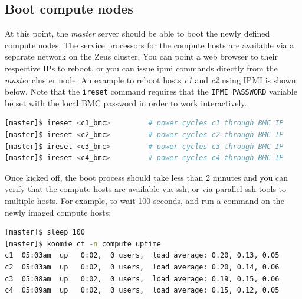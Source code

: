 \documentclass[letterpaper]{article}
\begin{document}


\subsection{Boot compute nodes}

At this point, the {\em master} server should be able to boot the newly defined
compute nodes.  The service processors for the compute hosts are available via
a separate network on the Zeus cluster. You can point a web browser to their
respective IPs to reboot, or you can issue ipmi commands directly from the {\em
  master} cluster node.  An example to reboot hosts {\em c1} and {\em c2} using
IPMI is shown below.  Note that the \texttt{ireset} command requires that the
\texttt{IPMI\_PASSWORD} variable be set with the local BMC password in order to
work interactively.

\vspace*{0.2cm}


\begin{lstlisting}[language=bash,keywords={},upquote=true]
[master]$ ireset <c1_bmc>         # power cycles c1 through BMC IP
[master]$ ireset <c2_bmc>         # power cycles c2 through BMC IP
[master]$ ireset <c3_bmc>         # power cycles c3 through BMC IP
[master]$ ireset <c4_bmc>         # power cycles c4 through BMC IP
\end{lstlisting} 


\vspace*{0.25cm}
Once kicked off, the boot process should take less than 2 minutes and you can
verify that the compute hosts are available via ssh, or via parallel ssh tools to multiple
hosts. For example, to wait 100 seconds, and run a command on the newly imaged
compute hosts:


\vspace*{0.2cm}
\begin{lstlisting}[language=bash]
[master]$ sleep 100
[master]$ koomie_cf -n compute uptime
c1  05:03am  up   0:02,  0 users,  load average: 0.20, 0.13, 0.05
c2  05:03am  up   0:02,  0 users,  load average: 0.20, 0.14, 0.06
c3  05:08am  up   0:02,  0 users,  load average: 0.19, 0.15, 0.06
c4  05:09am  up   0:02,  0 users,  load average: 0.15, 0.12, 0.05
\end{lstlisting}
\end{document}
